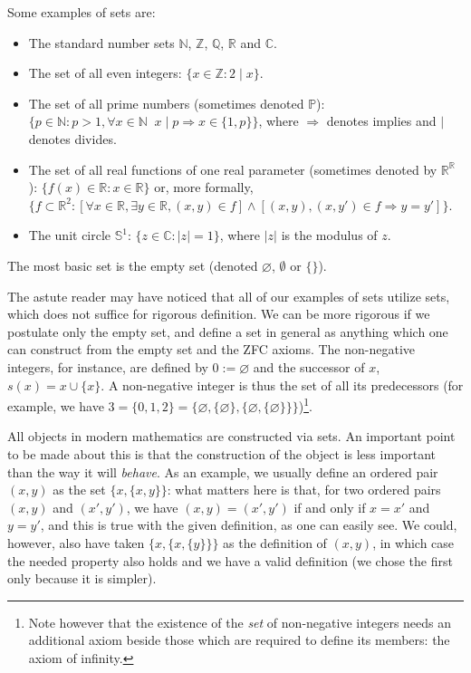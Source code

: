 \documentclass[12pt]{article}
\newcommand{\bbC}{\mathbb{C}}
\newcommand{\bbN}{\mathbb{N}}
\newcommand{\bbP}{\mathbb{P}}
\newcommand{\bbQ}{\mathbb{Q}}
\newcommand{\bbR}{\mathbb{R}}
\newcommand{\bbS}{\mathbb{S}}
\newcommand{\bbZ}{\mathbb{Z}}
\renewcommand{\div}{\!\mid\!}
\begin{document}
Some examples of sets are:

\begin{itemize}
\item The standard number sets $\bbN$, $\bbZ$, $\bbQ$, $\bbR$ and $\bbC$.
\item The set of all even integers: $\{ x \in \mathbb{Z} : 2 \div x \}.$
\item The set of all prime numbers (sometimes denoted $\bbP$): $\{ p \in \mathbb{N} : p > 1, \forall x \in \mathbb{N} \;\; x \div p \Rightarrow x \in \{1 , p \} \}$, where $\Rightarrow$ denotes implies and $\mid$ denotes divides.
\item The set of all real functions of one real parameter (sometimes denoted by $\bbR^\bbR$): $\{ f(x) \in \mathbb{R} : x \in \mathbb{R} \}$ or, more formally, $\{f \subset \bbR^2 : \left[\forall x\in \bbR, \exists y\in \bbR, (x,y)\in f\right] \wedge \left[(x,y),(x,y')\in f \Rightarrow  y=y'\right] \}$.
\item The unit circle $\bbS^1$: $\{z\in \bbC : |z| = 1\}$, where $|z|$ is the modulus of $z$.
\end{itemize}

The most basic set is the empty set (denoted $\varnothing$, $\emptyset$ or $\{\}$).

The astute reader may have noticed that all of our examples of sets utilize sets, which does not suffice for rigorous definition. We can be more rigorous if we postulate only the empty set, and define a set in general as anything which one can construct from the empty set and the ZFC axioms. The non-negative integers, for instance, are defined by $0 := \varnothing$ and the successor of $x$, $s(x) = x \cup \{x\}.$ A non-negative integer is thus the set of all its predecessors (for example, we have $3 = \{0,1,2\} = \{\varnothing, \{\varnothing\},\{\varnothing, \{\varnothing\}\}\}$)\footnote{Note however that the existence of the \emph{set} of non-negative integers needs an additional axiom beside those which are required to define its members: the axiom of infinity.}.

All objects in modern mathematics are constructed via sets. An important point to be made about this is that the construction of the object is less important than the way it will \emph{behave}. As an example, we usually define an ordered pair $(x,y)$ as the set $\{x,\{x,y\}\}$: what matters here is that, for two ordered pairs $(x,y)$ and $(x',y')$, we have $(x,y) = (x',y')$ if and only if $x = x'$ and $y = y'$, and this is true with the given definition, as one can easily see. We could, however, also have taken $\{x,\{x,\{y\}\}\}$ as the definition of $(x,y)$, in which case the needed property also holds and we have a valid definition (we chose the first only because it is simpler).
\end{document}

